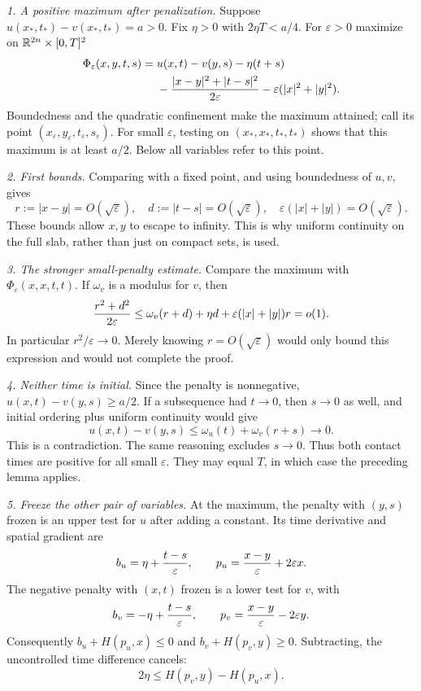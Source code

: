 \begin{expandedproof}
\textit{1. A positive maximum after penalization.}
Suppose $u(x_*,t_*)-v(x_*,t_*)=a>0$. Fix $\eta>0$ with
$2\eta T<a/4$. For $\varepsilon>0$ maximize on
$\mathbb{R}^{2n}\times[0,T]^2$
\begin{equation}\label{eq:10-doubling}
 \begin{split}
 \Phi_\varepsilon(x,y,t,s)={}&u(x,t)-v(y,s)-\eta(t+s)\\
 &-{|x-y|^2+|t-s|^2\over2\varepsilon}
 -\varepsilon(|x|^2+|y|^2).
 \end{split}
\end{equation}
Boundedness and the quadratic confinement make the maximum attained;
call its point $(x_\varepsilon,y_\varepsilon,t_\varepsilon,s_\varepsilon)$.
For small $\varepsilon$, testing on $(x_*,x_*,t_*,t_*)$ shows that
this maximum is at least $a/2$. Below all variables refer to this point.

\textit{2. First bounds.}
Comparing with a fixed point, and using boundedness of $u,v$, gives
\[
 r:=|x-y|=O(\sqrt\varepsilon),\quad
 d:=|t-s|=O(\sqrt\varepsilon),\quad
 \varepsilon(|x|+|y|)=O(\sqrt\varepsilon).
\]
These bounds allow $x,y$ to escape to infinity. This is why uniform
continuity on the full slab, rather than just on compact sets, is used.

\textit{3. The stronger small-penalty estimate.}
Compare the maximum with $\Phi_\varepsilon(x,x,t,t)$.
If $\omega_v$ is a modulus for $v$, then
\[
 {r^2+d^2\over2\varepsilon}
 \leq\omega_v(r+d)+\eta d
       +\varepsilon(|x|+|y|)r=o(1).
\]
In particular $r^2/\varepsilon\to0$. Merely knowing
$r=O(\sqrt\varepsilon)$ would only bound this expression and would
not complete the proof.

\textit{4. Neither time is initial.}
Since the penalty is nonnegative, $u(x,t)-v(y,s)\geq a/2$.
If a subsequence had $t\to0$, then $s\to0$ as well, and initial
ordering plus uniform continuity would give
\[
 u(x,t)-v(y,s)\leq\omega_u(t)+\omega_v(r+s)\longrightarrow0.
\]
This is a contradiction. The same reasoning excludes $s\to0$.
Thus both contact times are positive for all small $\varepsilon$.
They may equal $T$, in which case the preceding lemma applies.

\textit{5. Freeze the other pair of variables.}
At the maximum, the penalty with $(y,s)$ frozen is an upper test for
$u$ after adding a constant. Its time derivative and spatial gradient are
\[
 b_u=\eta+{t-s\over\varepsilon},\qquad
 p_u={x-y\over\varepsilon}+2\varepsilon x.
\]
The negative penalty with $(x,t)$ frozen is a lower test for $v$, with
\[
 b_v=-\eta+{t-s\over\varepsilon},\qquad
 p_v={x-y\over\varepsilon}-2\varepsilon y.
\]
Consequently $b_u+H(p_u,x)\leq0$ and $b_v+H(p_v,y)\geq0$.
Subtracting, the uncontrolled time difference cancels:
\[
 2\eta\leq H(p_v,y)-H(p_u,x).
\]


\end{expandedproof}
